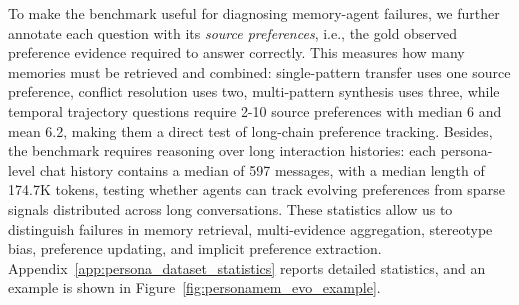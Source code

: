 \documentclass{article}
\begin{document}
To make the benchmark useful for diagnosing memory-agent failures, we further annotate each question with its \emph{source preferences}, i.e., the gold observed preference evidence required to answer correctly. 
This measures how many memories must be retrieved and combined: single-pattern transfer uses one source preference, conflict resolution uses two, multi-pattern synthesis uses three, while temporal trajectory questions require 2-10 source preferences with median 6 and mean 6.2, making them a direct test of long-chain preference tracking. 
Besides, the benchmark requires reasoning over long interaction histories: each persona-level chat history contains a median of 597 messages, with a median length of 174.7K tokens, testing whether agents can track evolving preferences from sparse signals distributed across long conversations.
These statistics allow us to distinguish failures in memory retrieval, multi-evidence aggregation, stereotype bias, preference updating, and implicit preference extraction. Appendix~\ref{app:persona_dataset_statistics} reports detailed statistics, and an example is shown in Figure~\ref{fig:personamem_evo_example}.
\end{document}
